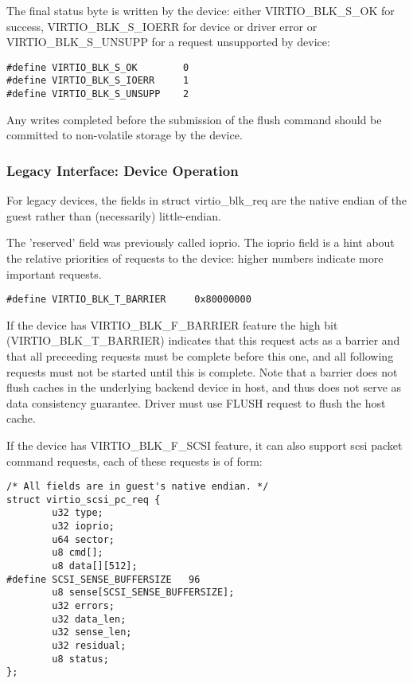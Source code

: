 The final status byte is written by the device: either
VIRTIO_BLK_S_OK for success, VIRTIO_BLK_S_IOERR for device or driver
error or VIRTIO_BLK_S_UNSUPP for a request unsupported by device:

\begin{lstlisting}
#define VIRTIO_BLK_S_OK        0
#define VIRTIO_BLK_S_IOERR     1
#define VIRTIO_BLK_S_UNSUPP    2
\end{lstlisting}

Any writes completed before the submission of the flush command should
be committed to non-volatile storage by the device.

\subsubsection{Legacy Interface: Device Operation}\label{sec:Device Types / Block Device / Device Operation / Legacy Interface: Device Operation}
For legacy devices, the fields in struct virtio_blk_req are the
native endian of the guest rather than (necessarily) little-endian.

The 'reserved' field was previously called ioprio.  The ioprio field
is a hint about the relative priorities of requests to the device:
higher numbers indicate more important requests.

\begin{lstlisting}
#define VIRTIO_BLK_T_BARRIER     0x80000000
\end{lstlisting}

If the device has VIRTIO_BLK_F_BARRIER
feature the high bit (VIRTIO_BLK_T_BARRIER) indicates that this
request acts as a barrier and that all preceeding requests must be
complete before this one, and all following requests must not be
started until this is complete. Note that a barrier does not flush
caches in the underlying backend device in host, and thus does not
serve as data consistency guarantee. Driver must use FLUSH request to
flush the host cache.

If the device has VIRTIO_BLK_F_SCSI feature, it can also support
scsi packet command requests, each of these requests is of form:

\begin{lstlisting}
/* All fields are in guest's native endian. */
struct virtio_scsi_pc_req {
        u32 type;
        u32 ioprio;
        u64 sector;
        u8 cmd[];
        u8 data[][512];
#define SCSI_SENSE_BUFFERSIZE   96
        u8 sense[SCSI_SENSE_BUFFERSIZE];
        u32 errors;
        u32 data_len;
        u32 sense_len;
        u32 residual;
        u8 status;
};
\end{lstlisting}

